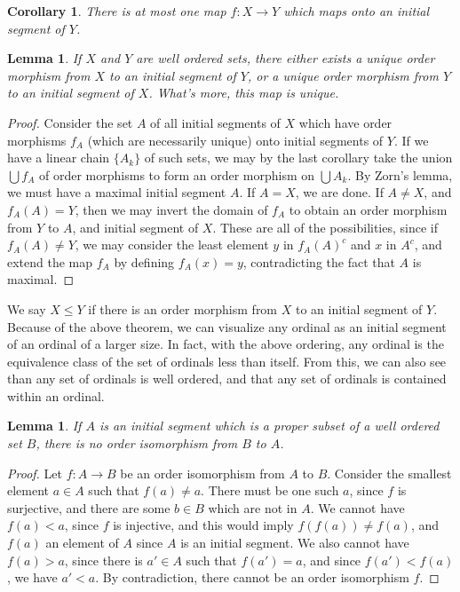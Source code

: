 \documentclass[12pt]{report}
\theoremstyle{plain}
\newtheorem{lemma}[theorem]{Lemma}
\newtheorem{corollary}[theorem]{Corollary}
\theoremstyle{definition}
\begin{document}
\begin{corollary}
    There is at most one map $f:X \to Y$ which maps onto an initial segment of $Y$.
\end{corollary}

\begin{lemma}
    If $X$ and $Y$ are well ordered sets, there either exists a unique order morphism from $X$ to an initial segment of $Y$, or a unique order morphism from $Y$ to an initial segment of $X$. What's more, this map is unique.
\end{lemma}
\begin{proof}
    Consider the set $A$ of all initial segments of $X$ which have order morphisms $f_A$ (which are necessarily unique) onto initial segments of $Y$. If we have a linear chain $\{A_k\}$ of such sets, we may by the last corollary take the union $\bigcup f_A$ of order morphisms to form an order morphism on $\bigcup A_k$. By Zorn's lemma, we must have a maximal initial segment $A$. If $A = X$, we are done. If $A \neq X$, and $f_A(A) = Y$, then we may invert the domain of $f_A$ to obtain an order morphism from $Y$ to $A$, and initial segment of $X$. These are all of the possibilities, since if $f_A(A) \neq Y$, we may consider the least element $y$ in $f_A(A)^c$ and $x$ in $A^c$, and extend the map $f_A$ by defining $f_A(x) = y$, contradicting the fact that $A$ is maximal.
\end{proof}

We say $X \leq Y$ if there is an order morphism from $X$ to an initial segment of $Y$. Because of the above theorem, we can visualize any ordinal as an initial segment of an ordinal of a larger size. In fact, with the above ordering, any ordinal is the equivalence class of the set of ordinals less than itself. From this, we can also see than any set of ordinals is well ordered, and that any set of ordinals is contained within an ordinal.

\begin{lemma}
    If $A$ is an initial segment which is a proper subset of a well ordered set $B$, there is no order isomorphism from $B$ to $A$.
\end{lemma}
\begin{proof}
    Let $f:A \to B$ be an order isomorphism from $A$ to $B$. Consider the smallest element $a \in A$ such that $f(a) \neq a$. There must be one such $a$, since $f$ is surjective, and there are some $b \in B$ which are not in $A$. We cannot have $f(a) < a$, since $f$ is injective, and this would imply $f(f(a)) \neq f(a)$, and $f(a)$ an element of $A$ since $A$ is an initial segment. We also cannot have $f(a) > a$, since there is $a' \in A$ such that $f(a') = a$, and since $f(a') < f(a)$, we have $a' < a$. By contradiction, there cannot be an order isomorphism $f$.
\end{proof}
\end{document}
